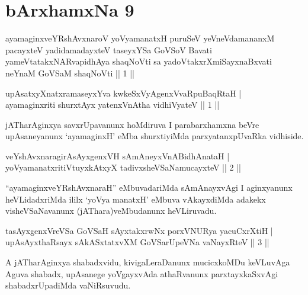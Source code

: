 
\section*{bArxhamxNa 9}

\begin{shl}
ayamaginxveYRshAvxnaroV yoV\s yamanatxH puruSeV yeVneVdamananxM pacayxteV yadidamadayxteV taseyxYSa GoVSoV Bavati yameVtatakxNARvapidhAya shaqNoVti sa yadoVtakxrXmiSayxnaBxvati neYnaM GoVSaM shaqNoVti || 1 ||
\end{shl}


\begin{shl}
upAsatxyXnatxramaseyxYva kwkeSxVyAgenxVvaRpuBaqRtaH | \\
ayamaginxriti shurxtAyx yatenxVnAtha vidhiVyateV \hfill ||  1 || 
\end{shl}

\begin{artha}
jATharAginxya savxrUpavanunx hoMdiruva I parabarxhamxna beVre upAsaneyanunx `ayamaginxH' eMba shurxtiyiMda parxyatanxpUvaRka vidhiside.
\end{artha}


\begin{shl}
veYshAvxnaragirA\s sAyxgenxVH sAmAneyxVnABidhAnataH | \\
yoV\s yamanatxritiVtuyxkAtxyX tadivxsheVSaNamucayxteV \hfill ||  2 || 
\end{shl}

\begin{artha}
``ayamaginxveYRshAvxnaraH'' eMbuvadariMda sAmAnayxvAgi I aginxyanunx heVLidadxriMda ililx `yoV\s ya manatxH' eMbuva vAkayxdiMda adakekx visheVSaNavanunx (jAThara)veMbudanunx heVLiruvadu.
\end{artha}


\begin{shl}
tasAyxgenxVreVSa GoVSaH sAyxtakxrwNx porxVNURya yacuCxrXtiH | \\
upAsAyxthaRsayx sAkASxtatxvXM GoVSarUpeVNa vaNayxRteV \hfill ||  3 || 
\end{shl}

\begin{artha}
A jATharAginxya shabadxvidu, kivigaLeraDanunx mucicxkoMDu keVLuvAga Aguva shabadx, upAsanege yoVgayxvAda athaRvanunx parxtayxkaSxvAgi shabadxrUpadiMda vaNiRsuvudu.
\end{artha}

